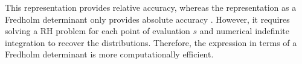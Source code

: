 \documentclass[11pt,fleqn]{article}
\numberwithin{equation}{section}
\begin{document}
This representation provides relative accuracy, whereas the representation as a Fredholm determinant only provides absolute accuracy  \cite{BornemannFredholmDet}.  However, it requires solving a RH problem for each point of evaluation $s$ and numerical indefinite integration to recover the distributions.  Therefore, the expression in terms of a Fredholm determinant is more computationally efficient.

%
%
%
%
%
%
%
%
%
%
%
%
%
%
%
%
%
\end{document}

